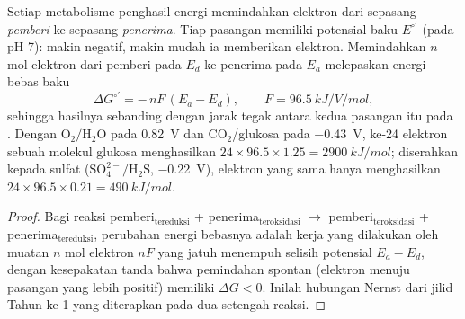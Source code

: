\begin{theorem}\label{thm:b2:microbial-metabolism:redox}
Setiap metabolisme penghasil energi memindahkan elektron dari sepasang
\emph{pemberi} ke sepasang \emph{penerima}. Tiap pasangan memiliki
potensial baku $E^{\circ\prime}$ (pada pH 7): makin negatif, makin
mudah ia memberikan elektron. Memindahkan $n$ mol elektron dari pemberi
pada $E_d$ ke penerima pada $E_a$ melepaskan energi bebas baku
\[
\Delta G^{\circ\prime} = -\,n F\,(E_a - E_d), \qquad F = \qty{96.5}{kJ/V/mol},
\]
sehingga hasilnya sebanding dengan jarak tegak antara kedua pasangan
itu pada \emph{}. Dengan
$\mathrm{O_2/H_2O}$ pada \qty{+0.82}{V} dan $\mathrm{CO_2}$/glukosa pada
\qty{-0.43}{V}, ke-24 elektron sebuah molekul glukosa menghasilkan
$24\times 96.5\times 1.25 = \qty{2900}{kJ/mol}$; diserahkan kepada
sulfat ($\mathrm{SO_4^{2-}/H_2S}$, \qty{-0.22}{V}), elektron yang sama
hanya menghasilkan $24\times 96.5\times 0.21 = \qty{490}{kJ/mol}$.
\end{theorem}
\begin{proof}
Bagi reaksi pemberi$_{\text{tereduksi}}$ + penerima$_{\text{teroksidasi}}$
$\to$ pemberi$_{\text{teroksidasi}}$ + penerima$_{\text{tereduksi}}$, perubahan energi
bebasnya adalah kerja yang dilakukan oleh muatan $n$ mol elektron $nF$
yang jatuh menempuh selisih potensial $E_a - E_d$, dengan kesepakatan
tanda bahwa pemindahan spontan (elektron menuju pasangan yang lebih
positif) memiliki $\Delta G < 0$. Inilah hubungan Nernst dari jilid
Tahun ke-1 yang diterapkan pada dua setengah reaksi.
\end{proof}

